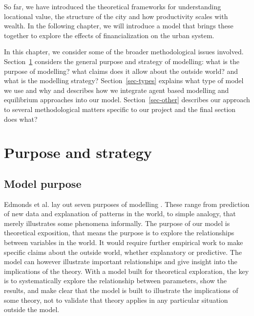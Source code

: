 So far, we have introduced the theoretical frameworks for understanding locational value, the structure of the city and how productivity scales with wealth. In the following chapter, we will introduce a model that brings these together to explore the effects of financialization on the urban system. 

In this chapter, we consider some of the broader methodological issues involved. Section~\ref{sec-purpose} considers the general purpose and strategy of modelling: what is the purpose of modelling? what claims does it allow about the outside world? and what is the modelling strategy? Section~\ref{sec-types} explains what type of model we use and why and describes how we integrate agent based modelling and equilibrium approaches into our model.   %
Section~\ref{sec-other} describes our approach to several methodological matters specific to our project  and the final section {\color{red} does what?}

\section{Purpose and strategy}\label{sec-purpose}
\subsection{Model purpose}

Edmonds et al. lay out seven purposes of modelling \cite{edmondsDifferentModellingPurposes2019}. These range from prediction of new data and explanation of patterns in the world, to simple analogy, that merely illustrates some phenomena informally. %
The purpose of our model is \gls{theoretical exposition}, that means the purpose is to explore the relationships between variables in the world. %
It would require further empirical work to make specific claims about 
the outside world, whether explanatory or predictive. The  model can however illustrate important relationships and give insight into the implications of the theory. With a model built for theoretical exploration, the key is to systematically explore the relationship between parameters, show the results, and %
make clear that the model is built to illustrate the implications of some theory, not to validate that theory applies in any particular situation outside the model. 


